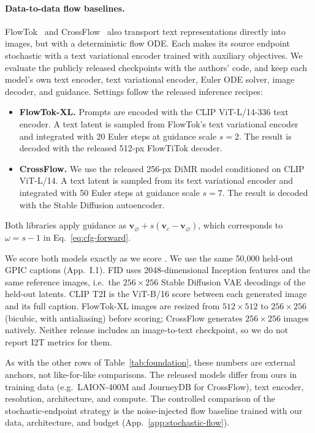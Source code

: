 \paragraph{Data-to-data flow baselines.}\label{app:external-baselines}
FlowTok~\citep{he2025flowtok} and CrossFlow~\citep{liu2025crossflow} also transport text
representations directly into images, but with a deterministic flow ODE. Each makes its
source endpoint stochastic with a text variational encoder trained with auxiliary
objectives. We evaluate the publicly released checkpoints with the authors' code, and keep
each model's own text encoder, text variational encoder, Euler ODE solver, image decoder,
and guidance. Settings follow the released inference recipes:
\begin{itemize}
  \item \textbf{FlowTok-XL.} Prompts are encoded with the CLIP ViT-L/14-336 text encoder.
    A text latent is sampled from FlowTok's text variational encoder and integrated with
    20 Euler steps at guidance scale $s=2$. The result is decoded with the released
    512-px FlowTiTok decoder.
  \item \textbf{CrossFlow.} We use the released 256-px DiMR model conditioned on CLIP
    ViT-L/14. A text latent is sampled from its text variational encoder and integrated
    with 50 Euler steps at guidance scale $s=7$. The result is decoded with the
    Stable Diffusion autoencoder.
\end{itemize}
Both libraries apply guidance as $\mathbf{v}_{\varnothing}+s(\mathbf{v}_{c}-\mathbf{v}_{\varnothing})$,
which corresponds to $\omega=s-1$ in Eq.~\eqref{eq:cfg-forward}.

We score both models exactly as we score \BIT{}. We use the same 50{,}000 held-out GPIC
captions (App.~I.1). FID uses 2048-dimensional Inception features and the same reference
images, i.e.\ the $256\times256$ Stable Diffusion VAE decodings of the held-out latents.
CLIP T2I is the ViT-B/16 score between each generated image and its full caption.
FlowTok-XL images are resized from $512\times512$ to $256\times256$ (bicubic, with
antialiasing) before scoring; CrossFlow generates $256\times256$ images natively. Neither
release includes an image-to-text checkpoint, so we do not report I2T metrics for them.

As with the other rows of Table~\ref{tab:foundation}, these numbers are external anchors,
not like-for-like comparisons. The released models differ from ours in training data
(e.g.\ LAION-400M and JourneyDB for CrossFlow), text encoder, resolution, architecture, and
compute. The controlled comparison of the stochastic-endpoint strategy is the
noise-injected flow baseline trained with our data, architecture, and budget
(App.~\ref{app:stochastic-flow}).
